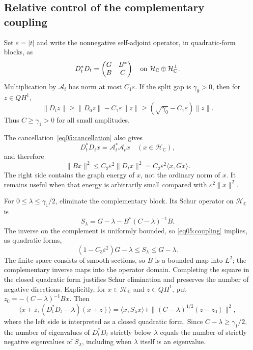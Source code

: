 \documentclass[11pt]{amsart}
\theoremstyle{definition}
\theoremstyle{remark}
\newcommand{\CC}{\mathbb C}
\newcommand{\HH}{\mathcal H}
\begin{document}
\subsection{Relative control of the complementary coupling}

Set \(\varepsilon=|t|\) and write the nonnegative self-adjoint
operator, in quadratic-form blocks, as
\[
 D_t^*D_t=
 \begin{pmatrix}G&B^*\\B&C\end{pmatrix}
 \quad\hbox{on }\HH_{\CC}\oplus\HH_{\CC}^{\perp}.
\]
Multiplication by \(\mathcal A_t\) has norm at most
\(C_1\varepsilon\). If the split gap is \(\gamma_0>0\), then
for \(z\in QH^1\),
\[
 \|D_tz\|\geq\|D_0z\|-C_1\varepsilon\|z\|
 \geq(\sqrt{\gamma_0}-C_1\varepsilon)\|z\|.
\]
Thus \(C\geq\gamma_1>0\) for all small amplitudes.

The cancellation~\eqref{eq05:cancellation} also gives
\[
 D_t^*D_tx=\mathcal A_t^*\mathcal A_tx
 \quad(x\in\HH_{\CC}),
\]
and therefore
\begin{equation}\label{eq05:coupling}
 \|Bx\|^2\leq C_2\varepsilon^2\|D_tx\|^2
             =C_2\varepsilon^2\langle x,Gx\rangle.
\end{equation}
The right side contains the graph energy of \(x\), not the
ordinary norm of \(x\). It remains useful when that energy is
arbitrarily small compared with \(\varepsilon^2\|x\|^2\).

For \(0\leq\lambda\leq\gamma_1/2\), eliminate the complementary
block. Its Schur operator on \(\HH_{\CC}\) is
\[
 S_\lambda=G-\lambda-B^*(C-\lambda)^{-1}B.
\]
The inverse on the complement is uniformly bounded, so
\eqref{eq05:coupling} implies, as quadratic forms,
\begin{equation}\label{eq05:schur}
 (1-C_3\varepsilon^2)G-\lambda
 \leq S_\lambda\leq G-\lambda.
\end{equation}
The finite space consists of smooth sections, so \(B\) is a
bounded map into \(L^2\); the complementary inverse maps into the
operator domain. Completing the square in the closed quadratic
form justifies Schur elimination and preserves the number of
negative directions. Explicitly, for \(x\in\HH_\CC\) and
\(z\in QH^1\), put \(z_0=-(C-\lambda)^{-1}Bx\). Then
\[
 \langle x+z,(D_t^*D_t-\lambda)(x+z)\rangle
 =\langle x,S_\lambda x\rangle
   +\|(C-\lambda)^{1/2}(z-z_0)\|^2,
\]
where the left side is interpreted as a closed quadratic form.
Since \(C-\lambda\ge\gamma_1/2\), the number of eigenvalues
of \(D_t^*D_t\) strictly below \(\lambda\) equals the number
of strictly negative eigenvalues of \(S_\lambda\), including
when \(\lambda\) itself is an eigenvalue.
\end{document}
